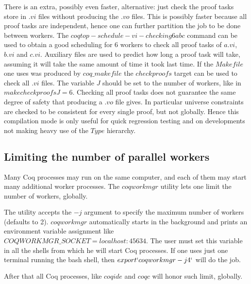 There is an extra, possibly even faster, alternative: just check
the proof tasks store in $.vi$ files without producing the $.vo$ files.
This is possibly faster because all proof tasks are independent, hence
one can further partition the job to be done between workers.
The $coqtop -schedule-vi-checking 6 a b c$ command can be used to obtain
a good scheduling for 6 workers to check all proof tasks of $a.vi$, $b.vi$ and
$c.vi$.  Auxiliary files are used to predict how long a proof task will take,
assuming it will take the same amount of time it took last time.
If the $Makefile$ one uses was produced by $coq\_makefile$ the $checkproofs$
target can be used to check all $.vi$ files.  The variable $J$ should be
set to the number of workers, like in $make checkproofs J=6$.
Checking all proof tasks does not guarantee the same degree of safety
that producing a $.vo$ file gives.  In particular universe constraints
are checked to be consistent for every single proof, but not globally.
Hence this compilation mode is only useful for quick regression testing
and on developments not making heavy use of the $Type$ hierarchy.

\subsection{Limiting the number of parallel workers}
\label{coqworkmgr}

Many Coq processes may run on the same computer, and each of them may start
many additional worker processes. 
The $coqworkmgr$ utility lets one limit the number of workers, globally.

The utility accepts the $-j$ argument to specify the maximum number of
workers (defaults to 2).  $coqworkmgr$ automatically starts in the
background and prints an environment variable assignment like
$COQWORKMGR\_SOCKET=localhost:45634$.  The user must set this variable in
all the shells from which he will start Coq processes.  If one uses just
one terminal running the bash shell, then $export `coqworkmgr -j 4`$ will
do the job.

After that all Coq processes, like $coqide$ and $coqc$ will honor such
limit, globally.


